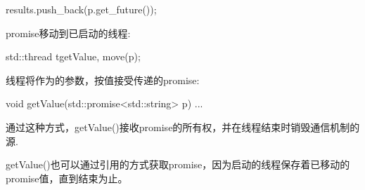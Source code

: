\begin{cppcode}
results.push_back(p.get_future());
\end{cppcode}

promise移动到已启动的线程:

\begin{cppcode}
std::thread t{getValue, move(p)};
\end{cppcode}

线程将作为的参数，按值接受传递的promise:

\begin{cppcode}
void getValue(std::promise<std::string> p)
{
	...
}
\end{cppcode}

通过这种方式，getValue()接收promise的所有权，并在线程结束时销毁通信机制的源.

getValue()也可以通过引用的方式获取promise，因为启动的线程保存着已移动的promise值，直到结束为止。














